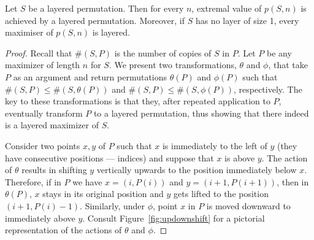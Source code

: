 \documentclass[12pt, a4paper, twoside]{report}
\begin{document}
\begin{theorem}
\label{thm:layered}
Let $S$ be a layered permutation. Then for every $n$, extremal value of $p(S,n)$ is achieved by a layered permutation. Moreover, if $S$ has no layer of size 1, every maximiser of $p(S,n)$ is layered.
\end{theorem}
\begin{proof}
Recall that $\#(S,P)$ is the number of copies of $S$ in $P$. Let $P$ be any maximizer of length $n$ for $S$. We present two transformations, $\theta$ and $\phi$, that take $P$ as an argument and return permutations $\theta(P)$ and $\phi(P)$ such that $\#(S,P) \leq \#(S,\theta(P))$ and $\#(S,P) \leq \#(S,\phi(P))$, respectively. The key to these transformations is that they, after repeated application to $P$, eventually transform $P$ to a layered permutation, thus showing that there indeed is a layered maximizer of $S$.

Consider two points $x,y$ of $P$ such that $x$ is immediately to the left of $y$ (they have consecutive positions --- indices) and suppose that $x$ is above $y$. The action of $\theta$ results in shifting $y$ vertically upwards to the position immediately below $x$. Therefore, if in $P$ we have $x = (i,P(i))$ and $y = (i+1,P(i+1))$, then in $\theta(P)$, $x$ stays in its original position and $y$ gets lifted to the position $(i+1, P(i)-1)$. Similarly, under $\phi$, point $x$ in $P$ is moved downward to immediately above $y$. Consult Figure~\ref{fig:updownshift} for a pictorial representation of the actions of $\theta$ and $\phi$. 


\end{proof}
\end{document}
